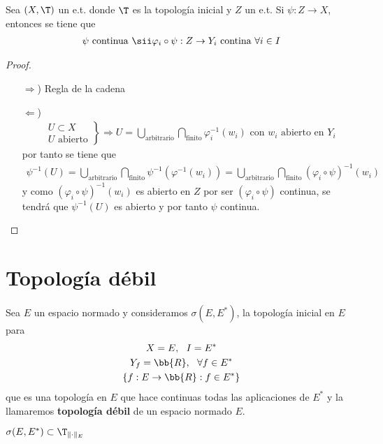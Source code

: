 \begin{prop}
    Sea $(X,\T)$ un e.t. donde $\T$ es la topología inicial y $Z$ un e.t. Si $\psi:Z\to X$, entonces se tiene que 
    \begin{gather*}
        \psi \text{ continua } \sii \varphi_i \circ \psi : Z\to Y_i \text{ contina } \forall i \in I
    \end{gather*}
    \begin{proof}\
        \begin{itemize}
            \item[$\Rightarrow$)] Regla de la cadena
            \item[$\Leftarrow$)] 
            \begin{gather*}
                \left.
                    \begin{array}{c}
                        U\subset X\\
                        U \text{ abierto}
                    \end{array}
                \right\} \Rightarrow U = \bigcup\limits_{\text{arbitrario}}\bigcap\limits_{\text{finito}} \varphi_i^{-1}(w_i)\text{ con } w_i \text{ abierto en }Y_i
            \end{gather*}
            por tanto se tiene que 
            \begin{gather*}
                \psi^{-1} (U) = \bigcup\limits_{\text{arbitrario}}\bigcap\limits_{\text{finito}} \psi^{-1}(\varphi^{-1}(w_i)) = \bigcup\limits_{\text{arbitrario}}\bigcap\limits_{\text{finito}} (\varphi_i \circ \psi)^{-1}(w_i)
            \end{gather*}
            y como $(\varphi_i \circ \psi)^{-1}(w_i)$ es abierto en $Z$ por ser $(\varphi_i \circ \psi)$ continua, se tendrá que $\psi^{-1}(U)$ es abierto y por tanto $\psi$ continua.
        \end{itemize}
    \end{proof}
\end{prop}

\section{Topología débil}

\begin{definicion}
    Sea $E$ un espacio normado y consideramos $\sigma(E,E^*)$, la topología inicial en $E$ para 
    \begin{gather*}
        X=E,\ \ I=E^*\\
        Y_f=\bb{R},\ \ \forall f \in E^*\\
        \{f:E\to \bb{R} : f\in E^*\}
    \end{gather*}
    que es una topología en $E$ que hace continuas todas las aplicaciones de $E^*$ y la llamaremos \textbf{topología débil} de un espacio normado $E$.
\end{definicion}
\begin{observacion}
    $\sigma(E,E^*) \subset \T_{\|\cdot \|_E}$
\end{observacion}

